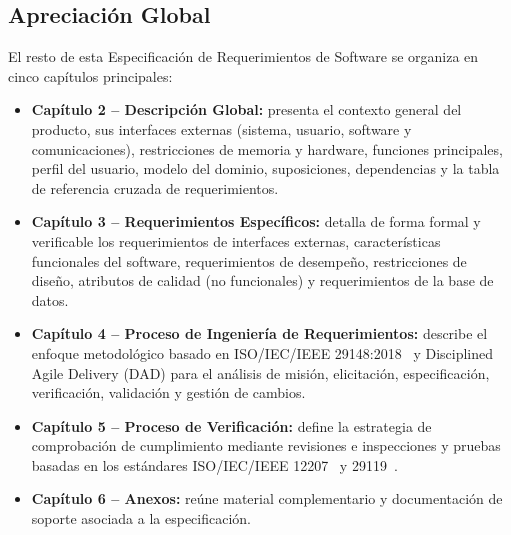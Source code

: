 \subsection{Apreciación Global}

El resto de esta Especificación de Requerimientos de Software se organiza en cinco capítulos principales:

\begin{itemize}
    \item \textbf{Capítulo 2 -- Descripción Global:} presenta el contexto general del producto, sus interfaces externas (sistema, usuario, software y comunicaciones), restricciones de memoria y hardware, funciones principales, perfil del usuario, modelo del dominio, suposiciones, dependencias y la tabla de referencia cruzada de requerimientos.
    \item \textbf{Capítulo 3 -- Requerimientos Específicos:} detalla de forma formal y verificable los requerimientos de interfaces externas, características funcionales del software, requerimientos de desempeño, restricciones de diseño, atributos de calidad (no funcionales) y requerimientos de la base de datos.
    \item \textbf{Capítulo 4 -- Proceso de Ingeniería de Requerimientos:} describe el enfoque metodológico basado en ISO/IEC/IEEE 29148:2018\textcolor{black}{~\cite{iso29148_2018}} y Disciplined Agile Delivery (DAD) para el análisis de misión, elicitación, especificación, verificación, validación y gestión de cambios.
    \item \textbf{Capítulo 5 -- Proceso de Verificación:} define la estrategia de comprobación de cumplimiento mediante revisiones e inspecciones y pruebas basadas en los estándares ISO/IEC/IEEE 12207\textcolor{black}{~\cite{iso12207_2026}} y 29119\textcolor{black}{~\cite{iso29119_2021}}.
    \item \textbf{Capítulo 6 -- Anexos:} reúne material complementario y documentación de soporte asociada a la especificación.
\end{itemize}